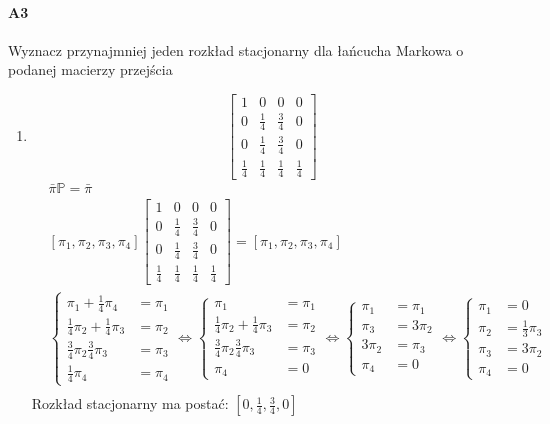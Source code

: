 \paragraph{A3} Wyznacz przynajmniej jeden rozkład stacjonarny dla łańcucha Markowa o podanej macierzy przejścia
\begin{enumerate}[label=\alph*)]
\item 
$$\begin{bmatrix}
1&0&0&0\\
0&\frac{1}{4}&\frac{3}{4}&0\\
0&\frac{1}{4}&\frac{3}{4}&0\\
\frac{1}{4}&\frac{1}{4}&\frac{1}{4}&\frac{1}{4}
\end{bmatrix}$$
\begin{align*}
&\bar{\pi}\mathbb{P}=\bar{\pi}\\
&\left[\pi _1, \pi _2,\pi _3,\pi _4\right]\begin{bmatrix}
1&0&0&0\\
0&\frac{1}{4}&\frac{3}{4}&0\\
0&\frac{1}{4}&\frac{3}{4}&0\\
\frac{1}{4}&\frac{1}{4}&\frac{1}{4}&\frac{1}{4}
\end{bmatrix}=\left[\pi _1, \pi _2,\pi _3,\pi _4\right]\\
&\left\{\begin{matrix}
\pi _1+\frac{1}{4}\pi _4 & = \pi _1\\
\frac{1}{4}\pi _2+\frac{1}{4}\pi _3 &= \pi _2\\
\frac{3}{4}\pi _2\frac{3}{4}\pi _3 &= \pi _3\\
\frac{1}{4}\pi _4 &= \pi _4
\end{matrix}\right.\Leftrightarrow \left\{\begin{matrix}
\pi _1 & = \pi _1\\
\frac{1}{4}\pi _2+\frac{1}{4}\pi _3 &= \pi _2\\
\frac{3}{4}\pi _2\frac{3}{4}\pi _3 &= \pi _3\\
\pi _4 &= 0
\end{matrix}\right.\Leftrightarrow \left\{\begin{matrix}
\pi _1 & = \pi _1\\
\pi _3 &= 3\pi _2\\
3\pi _2 &= \pi _3\\
\pi _4 &= 0
\end{matrix}\right.\Leftrightarrow \left\{\begin{matrix}
\pi _1 & = 0\\
\pi _2 &= \frac{1}{3}\pi _3\\
\pi _3 &= 3\pi _2\\
\pi _4 &= 0
\end{matrix}\right.\\
\end{align*}
Rozkład stacjonarny ma postać: $\left[0, \frac{1}{4}, \frac{3}{4}, 0\right]$


\end{enumerate}
